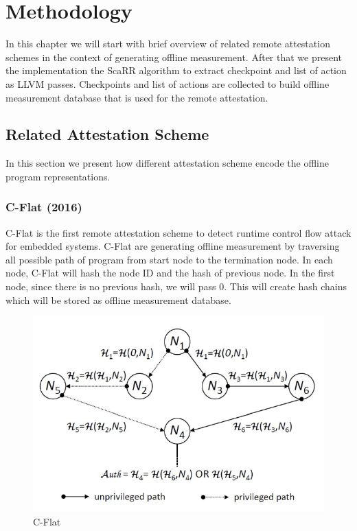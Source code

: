 
\chapter{Methodology} %

\label{Chapter4} %

In this chapter we will start with brief overview of related remote attestation schemes in the context of generating offline measurement. After that we present the implementation the ScaRR algorithm to extract checkpoint and list of action as LLVM passes. Checkpoints and list of actions are collected to build offline measurement database that is used for the remote attestation.

\section{Related Attestation Scheme}

In this section we present how different attestation scheme encode the offline program representations.

\subsection{C-Flat (2016)}

C-Flat \cite{aberaCFLATControlFlowAttestation2016} is the first remote attestation scheme to detect runtime control flow attack for embedded systems. C-Flat are generating offline measurement by traversing all possible path of program from start node to the termination node. In each node, C-Flat will hash the node ID and the hash of previous node. In the first node, since there is no previous hash, we will pass 0. This will create hash chains which will be stored as offline measurement database.

\begin{figure}[htbp]
\centerline{\includegraphics[scale=.5]{Figures/cflat.png}}
\caption{C-Flat}
\label{fig:4-1}
\end{figure}


